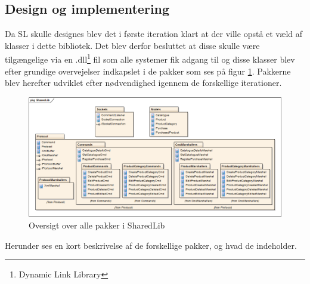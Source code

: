 \subsection{Design og implementering}

Da \gls{SL} skulle designes blev det i første iteration klart at der ville opstå et væld af klasser i dette bibliotek. Det blev derfor besluttet at disse skulle være tilgængelige via en .dll\footnote{Dynamic Link Library} fil som alle systemer fik adgang til og disse klasser blev efter grundige overvejelser indkapslet i de pakker som ses på figur \ref{fig:oversigtSL}. Pakkerne blev herefter udviklet efter nødvendighed igennem de forskellige iterationer.

\begin{figure}[!h]
    \centering
    \includegraphics[width=1.0\textwidth]{Systemdesign/SharedLib/Images/SharedLib_Package2.png}
    \caption{Oversigt over alle pakker i SharedLib}
    \label{fig:oversigtSL}
\end{figure}

Herunder ses en kort beskrivelse af de forskellige pakker, og hvad de indeholder.

